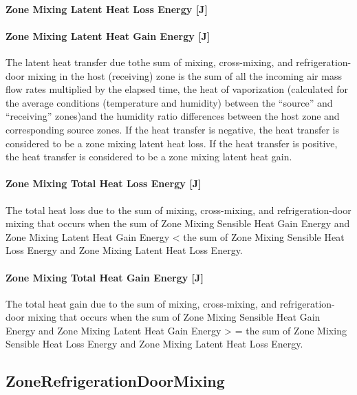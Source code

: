 \paragraph{Zone Mixing Latent Heat Loss Energy {[}J{]}}\label{zone-mixing-latent-heat-loss-energy-j-1}

\paragraph{Zone Mixing Latent Heat Gain Energy {[}J{]}}\label{zone-mixing-latent-heat-gain-energy-j-1}

The latent heat transfer due tothe sum of mixing, cross-mixing, and refrigeration-door mixing in the host (receiving) zone is the sum of all the incoming air mass flow rates multiplied by the elapsed time, the heat of vaporization (calculated for the average conditions (temperature and humidity) between the ``source'' and ``receiving'' zones)and the humidity ratio differences between the host zone and corresponding source zones. If the heat transfer is negative, the heat transfer is considered to be a zone mixing latent heat loss. If the heat transfer is positive, the heat transfer is considered to be a zone mixing latent heat gain.

\paragraph{Zone Mixing Total Heat Loss Energy {[}J{]}}\label{zone-mixing-total-heat-loss-energy-j-1}

The total heat loss due to the sum of mixing, cross-mixing, and refrigeration-door mixing that occurs when the sum of Zone Mixing Sensible Heat Gain Energy and Zone Mixing Latent Heat Gain Energy \textless{} the sum of Zone Mixing Sensible Heat Loss Energy and Zone Mixing Latent Heat Loss Energy.

\paragraph{Zone Mixing Total Heat Gain Energy {[}J{]}}\label{zone-mixing-total-heat-gain-energy-j-1}

The total heat gain due to the sum of mixing, cross-mixing, and refrigeration-door mixing that occurs when the sum of Zone Mixing Sensible Heat Gain Energy and Zone Mixing Latent Heat Gain Energy \textgreater{} = the sum of Zone Mixing Sensible Heat Loss Energy and Zone Mixing Latent Heat Loss Energy.

\subsection{ZoneRefrigerationDoorMixing}\label{zonerefrigerationdoormixing}

